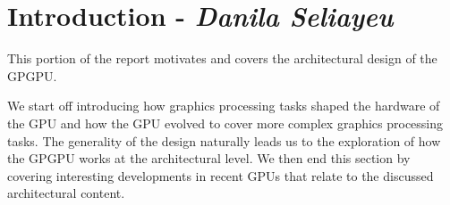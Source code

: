 \section{Introduction - \textit{Danila Seliayeu}}

This portion of the report motivates and covers the architectural design of the GPGPU.

We start off introducing how graphics processing tasks shaped the hardware of the GPU and how the GPU evolved to cover more complex graphics processing tasks.
The generality of the design naturally leads us to the exploration of how the GPGPU works at the architectural level.
We then end this section by covering interesting developments in recent GPUs that relate to the discussed architectural content.
